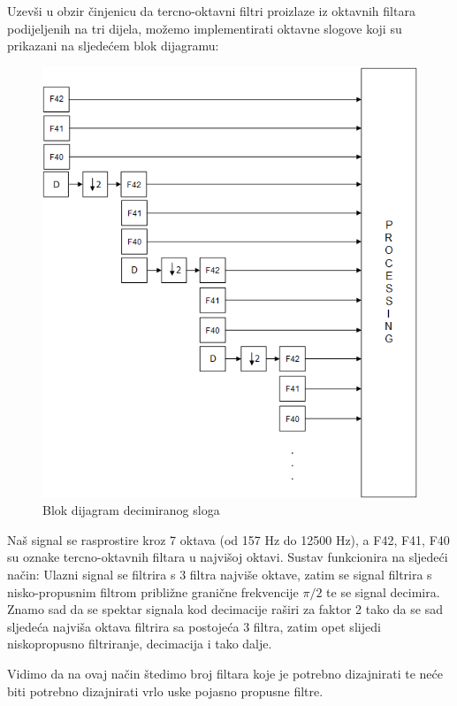 \documentclass[times, utf8, diplomski]{fer}
\begin{document}
Uzevši u obzir činjenicu da tercno-oktavni filtri proizlaze iz oktavnih filtara podijeljenih na tri dijela, možemo implementirati oktavne slogove koji su prikazani na sljedećem blok dijagramu:

\begin{figure}[hbt!]
 \centering
 \includegraphics[scale=0.6]{photos/decslog.png}
 \caption{Blok dijagram decimiranog sloga}
 \label{decslog}
\end{figure}

Naš signal se rasprostire kroz 7 oktava (od 157 Hz do 12500 Hz), a F42, F41, F40 su oznake tercno-oktavnih filtara u najvišoj oktavi. Sustav funkcionira na sljedeći način: Ulazni signal se filtrira s 3 filtra najviše oktave, zatim se signal filtrira s nisko-propusnim filtrom približne granične frekvencije $\pi/2$ te se signal decimira. Znamo sad da se spektar signala kod decimacije raširi za faktor 2 tako da se sad sljedeća najviša oktava filtrira sa postojeća 3 filtra, zatim opet slijedi niskopropusno filtriranje, decimacija i tako dalje.

Vidimo da na ovaj način štedimo broj filtara koje je potrebno dizajnirati te neće biti potrebno dizajnirati vrlo uske pojasno propusne filtre.
\end{document}
